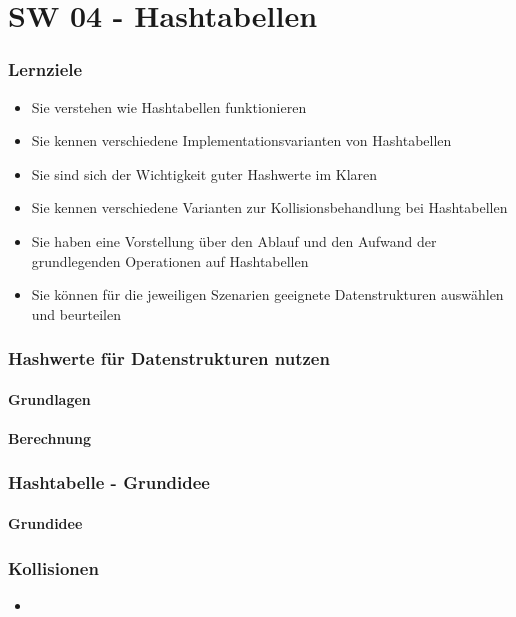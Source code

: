 \part{SW 04 - Hashtabellen}
\section{Lernziele}
\begin{itemize}[noitemsep,topsep=0pt,leftmargin=*]
    \item Sie verstehen wie Hashtabellen funktionieren
    \item Sie kennen verschiedene Implementationsvarianten von Hashtabellen
    \item Sie sind sich der Wichtigkeit guter Hashwerte im Klaren
    \item Sie kennen verschiedene Varianten zur Kollisionsbehandlung bei Hashtabellen
    \item Sie haben eine Vorstellung über den Ablauf und den Aufwand der grundlegenden Operationen auf Hashtabellen
    \item Sie können für die jeweiligen Szenarien geeignete Datenstrukturen auswählen und beurteilen
\end{itemize}

\section{Hashwerte für Datenstrukturen nutzen}
\subsection{Grundlagen}
\subsection{Berechnung}

\section{Hashtabelle - Grundidee}
\subsection{Grundidee}

\section{Kollisionen}
\begin{itemize}[noitemsep,topsep=0pt,leftmargin=*]
    \item
\end{itemize}
